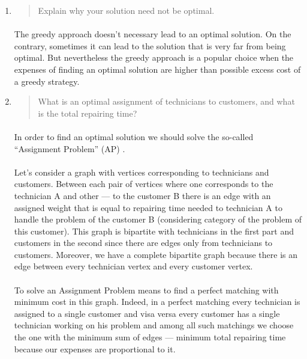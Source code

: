 \begin{enumerate}[(a)]
\begin{enumerate}[1.]
\item\begin{quote}Explain why your solution need not be optimal.\end{quote}

	\paragraph{}
	The greedy approach doesn't necessary lead to an optimal solution. On the contrary, sometimes it can lead to the solution that is very far from being optimal. But nevertheless the greedy approach is a popular choice when the expenses of finding an optimal solution are higher than possible excess cost of a greedy strategy.

\item\begin{quote}What is an optimal assignment of technicians to customers, and what is the
total repairing time?\end{quote}

	\paragraph{}
	In order to find an optimal solution we should solve the so-called ``Assignment Problem'' (AP) \cite{burkard12}.

	\paragraph{}
	Let's consider a graph with vertices corresponding to technicians and customers. Between each pair of vertices where one corresponds to the technician A and other --- to the customer B there is an edge with an assigned weight that is equal to repairing time needed to technician A to handle the problem of the customer B (considering category of the problem of this customer). This graph is bipartite with technicians in the first part and customers in the second since there are edges only from technicians to customers. Moreover, we have a complete bipartite graph because there is an edge between every technician vertex and every customer vertex.

	\paragraph{}
	To solve an Assignment Problem means to find a perfect matching with minimum cost in this graph. Indeed, in a perfect matching every technician is assigned to a single customer and visa versa every customer has a single technician working on his problem and among all such matchings we choose the one with the minimum sum of edges --- minimum total repairing time because our expenses are proportional to it.


\end{enumerate}
\end{enumerate}

